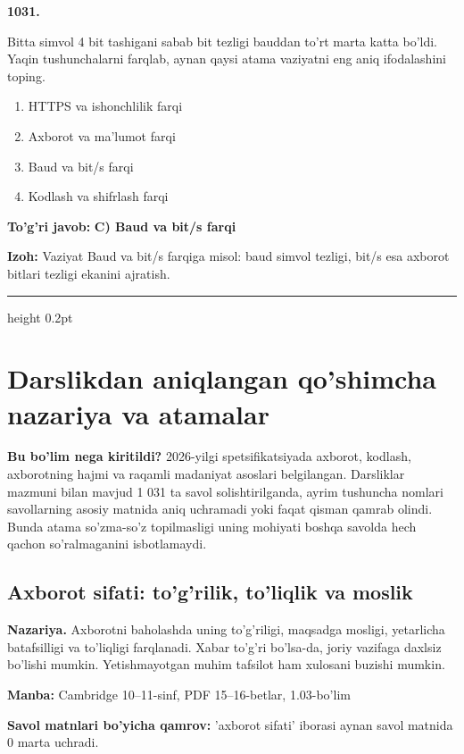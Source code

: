 \documentclass[10pt,a4paper,oneside]{article}
\begin{document}
\noindent\textbf{\color{ink}1031.}
\par
Bitta simvol 4 bit tashigani sabab bit tezligi bauddan to'rt marta katta bo'ldi. Yaqin tushunchalarni farqlab, aynan qaysi atama vaziyatni eng aniq ifodalashini toping.
\begin{enumerate}[label=\Alph*),leftmargin=9mm]
\item HTTPS va ishonchlilik farqi
\item Axborot va ma'lumot farqi
\item Baud va bit/s farqi
\item Kodlash va shifrlash farqi
\end{enumerate}
\begin{tcolorbox}[enhanced,breakable,colback=teal!4,colframe=teal!50!black,boxrule=0.5pt,arc=1.1mm,left=3mm,right=3mm,top=1.7mm,bottom=1.7mm,before skip=2mm,after skip=2mm]
\textbf{\color{teal}To'g'ri javob:} \textbf{C) Baud va bit/s farqi}
\par\smallskip
\textbf{Izoh:} Vaziyat Baud va bit/s farqiga misol: baud simvol tezligi, bit/s esa axborot bitlari tezligi ekanini ajratish.
\end{tcolorbox}
\vspace{2mm}\hrule height 0.2pt \vspace{3mm}
\clearpage
\section{Darslikdan aniqlangan qo'shimcha nazariya va atamalar}
\textbf{Bu bo'lim nega kiritildi?}
2026-yilgi spetsifikatsiyada axborot, kodlash, axborotning hajmi va
raqamli madaniyat asoslari belgilangan. Darsliklar mazmuni bilan
mavjud 1 031 ta savol solishtirilganda, ayrim tushuncha nomlari
savollarning asosiy matnida aniq uchramadi yoki faqat qisman qamrab olindi.
Bunda atama so'zma-so'z topilmasligi uning mohiyati boshqa savolda
hech qachon so'ralmaganini isbotlamaydi.
\subsection{Axborot sifati: to'g'rilik, to'liqlik va moslik}
\textbf{Nazariya.} Axborotni baholashda uning to'g'riligi, maqsadga mosligi, yetarlicha batafsilligi va to'liqligi farqlanadi. Xabar to'g'ri bo'lsa-da, joriy vazifaga daxlsiz bo'lishi mumkin. Yetishmayotgan muhim tafsilot ham xulosani buzishi mumkin.
\par\textbf{Manba:} Cambridge 10--11-sinf, PDF 15--16-betlar, 1.03-bo'lim
\par\textbf{Savol matnlari bo'yicha qamrov:} 'axborot sifati' iborasi aynan savol matnida 0 marta uchradi.
\end{document}
